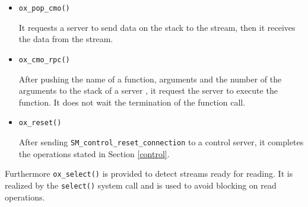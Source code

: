 \begin{itemize}
\item {\tt ox\_pop\_cmo()}

It requests a server to send data on the stack to the stream, then
it receives the data from the stream.

\item {\tt ox\_cmo\_rpc()}

After pushing the name of a function, arguments and the number of the
arguments to the stack of a server , it request the server to execute
the function. It does not wait the termination of the function call.

\item {\tt ox\_reset()}

After sending {\tt SM\_control\_reset\_connection} to a control server,
it completes the operations stated in Section \ref{control}.
\end{itemize}
Furthermore {\tt ox\_select()} is provided to detect streams ready for
reading. It is realized by the {\tt select()} system call and is used
to avoid blocking on read operations.
